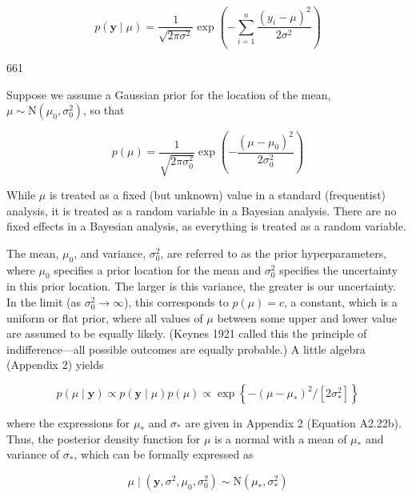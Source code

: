 \documentclass{article}
\begin{document}
\begin{equation}
p(\mathbf{y}\mid\mu)=\frac{1}{\sqrt{2\pi\sigma^{2}}}\exp\left(-\sum_{i=1}^{n}\frac{(y_{i}-\mu)^{2}}{2\sigma^{2}}\right)
\end{equation}

661

Suppose we assume a Gaussian prior for the location of the mean,  $ \mu \sim \mathrm{N}(\mu_0, \sigma_0^2) $, so that

\begin{equation}
p(\mu)=\frac{1}{\sqrt{2\pi\sigma_{0}^{2}}}\exp\left(-\frac{(\mu-\mu_{0})^{2}}{2\sigma_{0}^{2}}\right)
\end{equation}

While  $ \mu $ is treated as a fixed (but unknown) value in a standard (frequentist) analysis, it is treated as a random variable in a Bayesian analysis. There are no fixed effects in a Bayesian analysis, as everything is treated as a random variable.

The mean, $\mu_0$, and variance, $\sigma_0^2$, are referred to as the prior hyperparameters, where $\mu_0$ specifies a prior location for the mean and $\sigma_0^2$ specifies the uncertainty in this prior location. The larger is this variance, the greater is our uncertainty. In the limit (as $\sigma_0^2 \to \infty$), this corresponds to $p(\mu) = c$, a constant, which is a uniform or flat prior, where all values of $\mu$ between some upper and lower value are assumed to be equally likely. (Keynes 1921 called this the principle of indifference—all possible outcomes are equally probable.) A little algebra (Appendix 2) yields

\begin{equation}
p(\mu\mid\mathbf{y})\propto p(\mathbf{y}\mid\mu)p(\mu)\propto\exp\left\{-(\mu-\mu_{*})^{2}/[2\sigma_{*}^{2}]\right\}
\end{equation}

where the expressions for  $ \mu_* $ and  $ \sigma_* $ are given in Appendix 2 (Equation A2.22b). Thus, the posterior density function for  $ \mu $ is a normal with a mean of  $ \mu_* $ and variance of  $ \sigma_* $, which can be formally expressed as

\begin{equation}
\mu\mid\left(\mathbf{y},\sigma^{2},\mu_{0},\sigma_{0}^{2}\right)\sim\mathrm{N}\left(\mu_{*},\sigma_{*}^{2}\right)
\end{equation}
\end{document}
